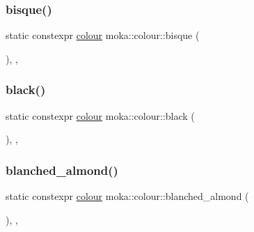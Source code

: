 \subsubsection{\texorpdfstring{bisque()}{bisque()}}
{\footnotesize\ttfamily static constexpr \mbox{\hyperlink{classmoka_1_1colour}{colour}} moka\+::colour\+::bisque (\begin{DoxyParamCaption}{ }\end{DoxyParamCaption})\hspace{0.3cm}{\ttfamily [inline]}, {\ttfamily [static]}, {\ttfamily [noexcept]}}

\mbox{\label{classmoka_1_1colour_a9a13c40cfd103597ad9fe270e6eedc99}} 
\subsubsection{\texorpdfstring{black()}{black()}}
{\footnotesize\ttfamily static constexpr \mbox{\hyperlink{classmoka_1_1colour}{colour}} moka\+::colour\+::black (\begin{DoxyParamCaption}{ }\end{DoxyParamCaption})\hspace{0.3cm}{\ttfamily [inline]}, {\ttfamily [static]}, {\ttfamily [noexcept]}}

\mbox{\label{classmoka_1_1colour_a6d76417a9430cf492b4288fdcee2b6d0}} 
\subsubsection{\texorpdfstring{blanched\_almond()}{blanched\_almond()}}
{\footnotesize\ttfamily static constexpr \mbox{\hyperlink{classmoka_1_1colour}{colour}} moka\+::colour\+::blanched\+\_\+almond (\begin{DoxyParamCaption}{ }\end{DoxyParamCaption})\hspace{0.3cm}{\ttfamily [inline]}, {\ttfamily [static]}, {\ttfamily [noexcept]}}

\mbox{\label{classmoka_1_1colour_a38dd73ca19580132063e3a2c1e4862bf}} 
